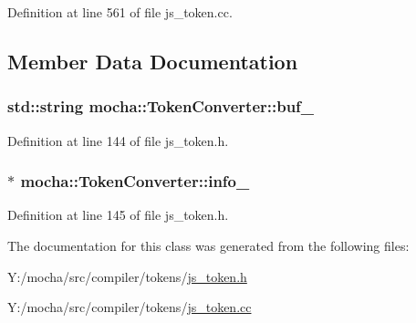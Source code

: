 Definition at line 561 of file js\_\-token.cc.



\subsection{Member Data Documentation}
\hypertarget{classmocha_1_1_token_converter_a8f43e8c3e0219337187ac5d080c8eaf7}{
\subsubsection[{buf\_\-}]{\setlength{\rightskip}{0pt plus 5cm}std::string {\bf mocha::TokenConverter::buf\_\-}}}
\label{classmocha_1_1_token_converter_a8f43e8c3e0219337187ac5d080c8eaf7}


Definition at line 144 of file js\_\-token.h.

\hypertarget{classmocha_1_1_token_converter_adb33fad25e24a7f086559c627ff42dda}{
\subsubsection[{info\_\-}]{$\ast$ {\bf mocha::TokenConverter::info\_\-}}}
\label{classmocha_1_1_token_converter_adb33fad25e24a7f086559c627ff42dda}


Definition at line 145 of file js\_\-token.h.



The documentation for this class was generated from the following files:\begin{DoxyCompactItemize}
\item 
Y:/mocha/src/compiler/tokens/\hyperlink{js__token_8h}{js\_\-token.h}\item 
Y:/mocha/src/compiler/tokens/\hyperlink{js__token_8cc}{js\_\-token.cc}\end{DoxyCompactItemize}

